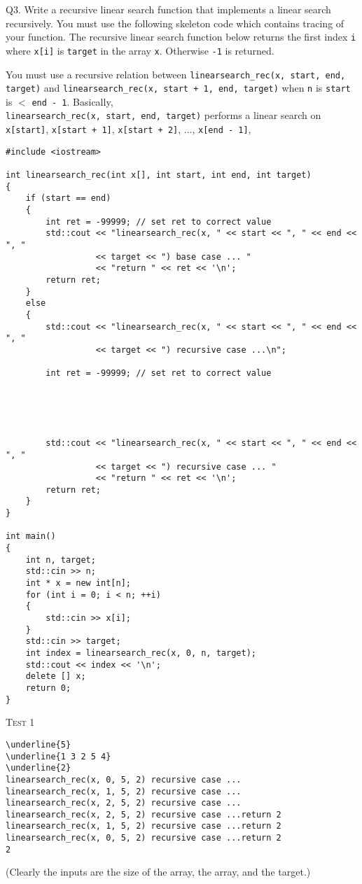 Q3.
Write a recursive linear search function that implements
a linear search recursively.
You must use the following skeleton code which
contains tracing of your function.
The recursive linear search function below returns
the first index \verb!i! where \verb!x[i]! is \verb!target!
in the array \verb!x!.
Otherwise \verb!-1! is returned.

You must use a recursive relation between
\verb!linearsearch_rec(x, start, end, target)!
and
\verb!linearsearch_rec(x, start + 1, end, target)!
when \verb!n! is \verb!start! is $<$ \verb!end - 1!.
Basically,
\\
\verb!linearsearch_rec(x, start, end, target)!
performs a linear search on
\\
\verb!x[start]!,
\verb!x[start + 1]!,
\verb!x[start + 2]!, ...,
\verb!x[end - 1]!,

\begin{Verbatim}[frame=single, fontsize=\small,commandchars=\~\!\@]
#include <iostream>

int linearsearch_rec(int x[], int start, int end, int target)
{
    if (start == end)
    {
        int ret = -99999; // set ret to correct value
        std::cout << "linearsearch_rec(x, " << start << ", " << end << ", "
                  << target << ") base case ... "
                  << "return " << ret << '\n';
        return ret;
    }
    else
    {
        std::cout << "linearsearch_rec(x, " << start << ", " << end << ", "
                  << target << ") recursive case ...\n";

        int ret = -99999; // set ret to correct value





        std::cout << "linearsearch_rec(x, " << start << ", " << end << ", "
                  << target << ") recursive case ... "
                  << "return " << ret << '\n';
        return ret;        
    }
}

int main()
{
    int n, target;
    std::cin >> n;
    int * x = new int[n];
    for (int i = 0; i < n; ++i)
    {
        std::cin >> x[i];
    }
    std::cin >> target;
    int index = linearsearch_rec(x, 0, n, target);
    std::cout << index << '\n';
    delete [] x;
    return 0;
}
\end{Verbatim}

\textsc{Test 1}
\begin{Verbatim}[commandchars=\\\{\}, fontsize=\small, frame=single]
\underline{5}
\underline{1 3 2 5 4}
\underline{2}
linearsearch_rec(x, 0, 5, 2) recursive case ...
linearsearch_rec(x, 1, 5, 2) recursive case ...
linearsearch_rec(x, 2, 5, 2) recursive case ...
linearsearch_rec(x, 2, 5, 2) recursive case ...return 2
linearsearch_rec(x, 1, 5, 2) recursive case ...return 2
linearsearch_rec(x, 0, 5, 2) recursive case ...return 2
2
\end{Verbatim}
(Clearly the inputs are the size of the array, the array, and the target.)

